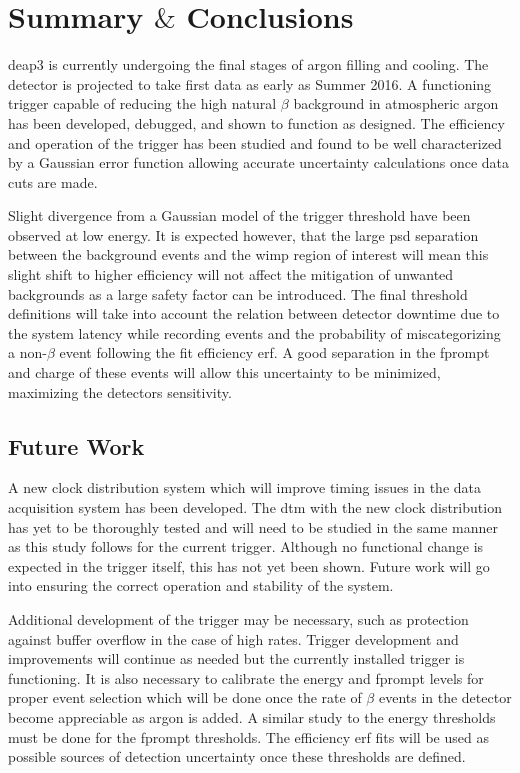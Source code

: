\chapter{Summary $\&$ Conclusions}
\label{chap:Conclusion}
\gls{deap3} is currently undergoing the final stages of argon filling and cooling. The detector is projected to take first data as early as Summer 2016. A functioning trigger capable of reducing the high natural $\beta$ background in atmospheric argon has been developed, debugged, and shown to function as designed. The efficiency and operation of the trigger has been studied and found to be well characterized by a Gaussian error function allowing accurate uncertainty calculations once data cuts are made. 

Slight divergence from a Gaussian model of the trigger threshold have been observed at low energy. It is expected however, that the large \gls{psd} separation between the background events and the \gls{wimp} region of interest will mean this slight shift to higher efficiency will not affect the mitigation of unwanted backgrounds as a large safety factor can be introduced. The final threshold definitions will take into account the relation between detector downtime due to the system latency while recording events and the probability of miscategorizing a non-$\beta$ event following the fit efficiency \gls{erf}. A good separation in the \gls{fprompt} and charge of these events will allow this uncertainty to be minimized, maximizing the detectors sensitivity.

\section{Future Work}
A new clock distribution system which will improve timing issues in the data acquisition system has been developed. The \gls{dtm} with the new clock distribution has yet to be thoroughly tested and will need to be studied in the same manner as this study follows for the current trigger. Although no functional change is expected in the trigger itself, this has not yet been shown. Future work will go into ensuring the correct operation and stability of the system. 

Additional development of the trigger may be necessary, such as protection against buffer overflow in the case of high rates. Trigger development and improvements will continue as needed but the currently installed trigger is functioning. It is also necessary to calibrate the energy and \gls{fprompt} levels for proper event selection which will be done once the rate of $\beta$ events in the detector become appreciable as argon is added. A similar study to the energy thresholds must be done for the \gls{fprompt} thresholds. The efficiency \gls{erf} fits will be used as possible sources of detection uncertainty once these thresholds are defined.